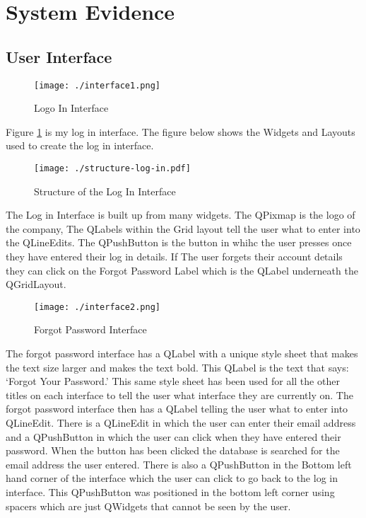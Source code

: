 	
	
	


\section{System Evidence}

\subsection{User Interface}

\begin{figure}[H]
    \texttt{[image: ./interface1.png]}
    \caption{Logo In Interface} \label{fig:log-in-interface}
\end{figure}

Figure \ref{fig:log-in-interface} is my log in interface. The figure below shows the Widgets and Layouts used to create the log in interface. 

\begin{figure}[H]
    \texttt{[image: ./structure-log-in.pdf]}
    \caption{Structure of the Log In Interface} \label{fig:log-in-structure}
\end{figure}

The Log in Interface is built up from many widgets. The QPixmap is the logo of the company, The QLabels within the Grid layout tell the user what to enter into the QLineEdits. The QPushButton is the button in whihc the user presses once they have entered their log in details. If The user forgets their account details they can click on the Forgot Password Label which is the QLabel underneath the QGridLayout.

\begin{figure}[H]
    \texttt{[image: ./interface2.png]}
    \caption{Forgot Password Interface} \label{fig:forgot-password-interface}
\end{figure}

The forgot password interface has a QLabel with a unique style sheet that makes the text size larger and makes the text bold. This QLabel is the text that says: `Forgot Your Password.' This same style sheet has been used for all the other titles on each interface to tell the user what interface they are currently on. The forgot password interface then has a QLabel telling the user what to enter into QLineEdit. There is a QLineEdit in which the user can enter their email address and a QPushButton in which the user can click when they have entered their password. When the button has been clicked the database is searched for the email address the user entered. There is also a QPushButton in the Bottom left hand corner of the interface which the user can click to go back to the log in interface. This QPushButton was positioned in the bottom left corner using spacers which are just QWidgets that cannot be seen by the user.


